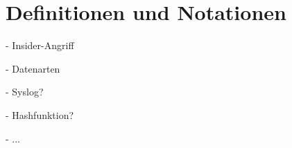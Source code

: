 \section{Definitionen und Notationen}

\label{sec_basics_definitions}

- Insider-Angriff

- Datenarten

- Syslog?

- Hashfunktion?

- ...